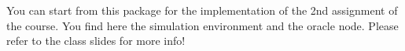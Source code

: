 You can start from this package for the implementation of the 2nd assignment of the course. You find here the simulation environment and the oracle node. Please refer to the class slides for more info! 